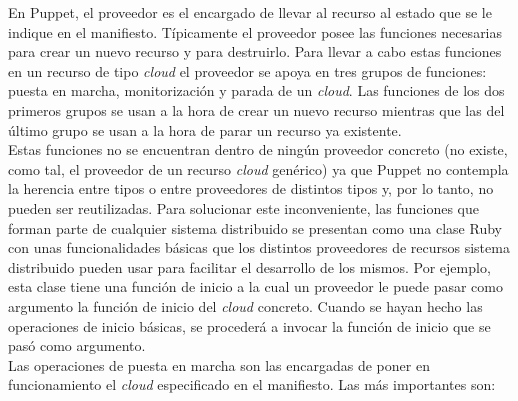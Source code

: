 En Puppet, el proveedor es el encargado de llevar al recurso al estado que se le indique en el manifiesto. Típicamente el proveedor posee las funciones necesarias para crear un nuevo recurso y para destruirlo. Para llevar a cabo estas funciones en un recurso de tipo \emph{cloud} el proveedor se apoya en tres grupos de funciones: puesta en marcha, monitorización y parada de un \emph{cloud}. Las funciones de los dos primeros grupos se usan a la hora de crear un nuevo recurso mientras que las del último grupo se usan a la hora de parar un recurso ya existente. \\

Estas funciones no se encuentran dentro de ningún proveedor concreto (no existe, como tal, el proveedor de un recurso \emph{cloud} genérico) ya que Puppet no contempla la herencia entre tipos o entre proveedores de distintos tipos y, por lo tanto, no pueden ser reutilizadas. Para solucionar este inconveniente, las funciones que forman parte de cualquier sistema distribuido se presentan como una clase Ruby con unas funcionalidades básicas que los distintos proveedores de recursos sistema distribuido pueden usar para facilitar el desarrollo de los mismos. Por ejemplo, esta clase tiene una función de inicio a la cual un proveedor le puede pasar como argumento la función de inicio del \emph{cloud} concreto. Cuando se hayan hecho las operaciones de inicio básicas, se procederá a invocar la función de inicio que se pasó como argumento. \\

Las operaciones de puesta en marcha son las encargadas de poner en funcionamiento el \emph{cloud} especificado en el manifiesto. Las más importantes son:

